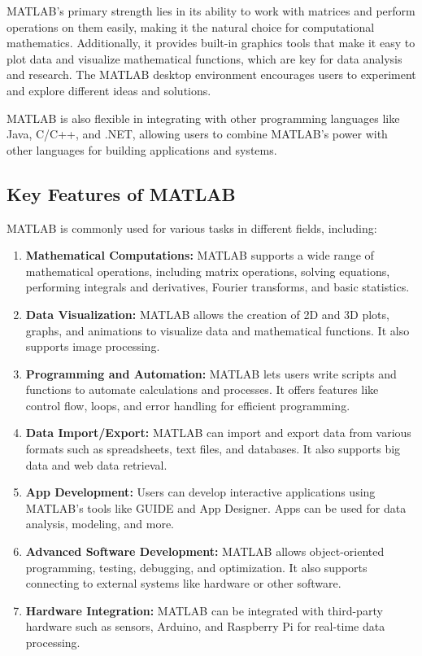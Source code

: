 \documentclass[a4paper,12pt]{article}
\begin{document}
MATLAB's primary strength lies in its ability to work with matrices and perform operations on them easily, making it the natural choice for computational mathematics. Additionally, it provides built-in graphics tools that make it easy to plot data and visualize mathematical functions, which are key for data analysis and research. The MATLAB desktop environment encourages users to experiment and explore different ideas and solutions.

MATLAB is also flexible in integrating with other programming languages like Java, C/C++, and .NET, allowing users to combine MATLAB's power with other languages for building applications and systems.

\subsection*{Key Features of MATLAB}
MATLAB is commonly used for various tasks in different fields, including:

\begin{enumerate}
	\item \textbf{Mathematical Computations:} MATLAB supports a wide range of mathematical operations, including matrix operations, solving equations, performing integrals and derivatives, Fourier transforms, and basic statistics.
	\item \textbf{Data Visualization:} MATLAB allows the creation of 2D and 3D plots, graphs, and animations to visualize data and mathematical functions. It also supports image processing.
	\item \textbf{Programming and Automation:} MATLAB lets users write scripts and functions to automate calculations and processes. It offers features like control flow, loops, and error handling for efficient programming.
	\item \textbf{Data Import/Export:} MATLAB can import and export data from various formats such as spreadsheets, text files, and databases. It also supports big data and web data retrieval.
	\item \textbf{App Development:} Users can develop interactive applications using MATLAB’s tools like GUIDE and App Designer. Apps can be used for data analysis, modeling, and more.
	\item \textbf{Advanced Software Development:} MATLAB allows object-oriented programming, testing, debugging, and optimization. It also supports connecting to external systems like hardware or other software.
	\item \textbf{Hardware Integration:} MATLAB can be integrated with third-party hardware such as sensors, Arduino, and Raspberry Pi for real-time data processing.
\end{enumerate}
\end{document}
